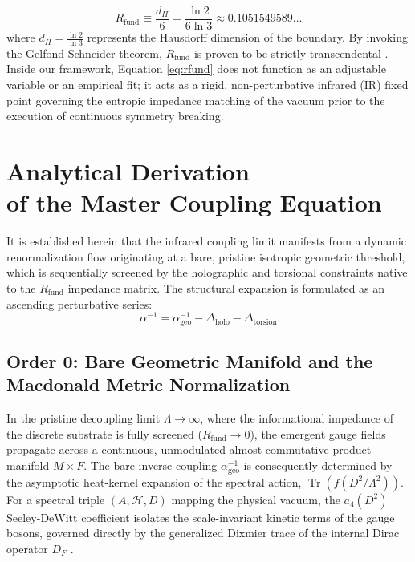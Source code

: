 \documentclass[12pt,a4paper]{article}
\begin{document}
\begin{equation}
R_{\text{fund}} \equiv \frac{d_H}{6} = \frac{\ln 2}{6 \ln 3} \approx 0.1051549589\dots
\label{eq:rfund}
\end{equation}
where $d_H = \frac{\ln 2}{\ln 3}$ represents the Hausdorff dimension of the boundary. By invoking the Gelfond-Schneider theorem, $R_{\text{fund}}$ is proven to be strictly transcendental \cite{peinador2026_foundational}. Inside our framework, Equation \eqref{eq:rfund} does not function as an adjustable variable or an empirical fit; it acts as a rigid, non-perturbative infrared (IR) fixed point governing the entropic impedance matching of the vacuum prior to the execution of continuous symmetry breaking.


\section{\texorpdfstring{Analytical Derivation\\ of the Master Coupling Equation}{Analytical Derivation of the Master Coupling Equation}}

It is established herein that the infrared coupling limit manifests from a dynamic renormalization flow originating at a bare, pristine isotropic geometric threshold, which is sequentially screened by the holographic and torsional constraints native to the $R_{\text{fund}}$ impedance matrix. The structural expansion is formulated as an ascending perturbative series:
\begin{equation}
\alpha^{-1} = \alpha^{-1}_{\text{geo}} - \Delta_{\text{holo}} - \Delta_{\text{torsion}}
\end{equation}

\subsection{Order 0: Bare Geometric Manifold and the Macdonald Metric Normalization}

In the pristine decoupling limit $\Lambda \to \infty$, where the informational impedance of the discrete substrate is fully screened ($R_{\text{fund}} \to 0$), the emergent gauge fields propagate across a continuous, unmodulated almost-commutative product manifold $M \times F$. The bare inverse coupling $\alpha^{-1}_{\text{geo}}$ is consequently determined by the asymptotic heat-kernel expansion of the spectral action, $\operatorname{Tr}(f(D^2/\Lambda^2))$. For a spectral triple $(A, \mathcal{H}, D)$ mapping the physical vacuum, the $a_4(D^2)$ Seeley-DeWitt coefficient isolates the scale-invariant kinetic terms of the gauge bosons, governed directly by the generalized Dixmier trace of the internal Dirac operator $D_F$ \cite{chamseddine1997, connes1996}.
\end{document}
